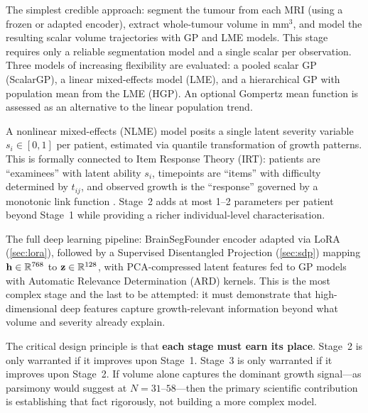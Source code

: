 \begin{description}[leftmargin=*,labelwidth=!]
  \item[Stage 1 --- Segmentation-Based Volumetric Baseline (\cref{sec:growth:stage1}).]
    The simplest credible approach: segment the tumour from each MRI
    (using a frozen or adapted encoder), extract whole-tumour volume in mm$^3$,
    and model the resulting scalar volume trajectories with GP and LME models.
    This stage requires only a reliable segmentation model and a single scalar
    per observation. Three models of increasing flexibility are evaluated:
    a pooled scalar GP (ScalarGP), a linear mixed-effects model (LME), and a
    hierarchical GP with population mean from the LME (HGP). An optional
    Gompertz mean function is assessed as an alternative to the linear
    population trend.

  \item[Stage 2 --- Latent Severity Model (\cref{sec:growth:stage2}).]
    A nonlinear mixed-effects (NLME) model posits a single latent severity
    variable $s_i \in [0, 1]$ per patient, estimated via quantile
    transformation of growth patterns. This is formally connected to Item
    Response Theory (IRT): patients are ``examinees'' with latent ability
    $s_i$, timepoints are ``items'' with difficulty determined by $t_{ij}$,
    and observed growth is the ``response'' governed by a monotonic link
    function \cite{vaghi2020reduced,proustlima2014joint}. Stage~2 adds at
    most 1--2 parameters per patient beyond Stage~1 while providing a richer
    individual-level characterisation.

  \item[Stage 3 --- Representation Learning (\cref{sec:growth:stage3}).]
    The full deep learning pipeline: BrainSegFounder
    \cite{cox2024brainsegfounder} encoder adapted via LoRA
    \cite{hu2022lora} (\cref{sec:lora}), followed by a Supervised
    Disentangled Projection \cite{locatello2019challenging} (\cref{sec:sdp})
    mapping $\mathbf{h} \in \mathbb{R}^{768}$ to $\mathbf{z} \in \mathbb{R}^{128}$, with
    PCA-compressed latent features fed to GP models with Automatic Relevance
    Determination (ARD) kernels. This is the most complex stage and the last
    to be attempted: it must demonstrate that high-dimensional deep features
    capture growth-relevant information beyond what volume and severity
    already explain.
\end{description}

The critical design principle is that \textbf{each stage must earn its place}.
Stage~2 is only warranted if it improves upon Stage~1. Stage~3 is only
warranted if it improves upon Stage~2. If volume alone captures the dominant
growth signal---as parsimony would suggest at $N = 31$--$58$---then the
primary scientific contribution is establishing that fact rigorously, not
building a more complex model.

